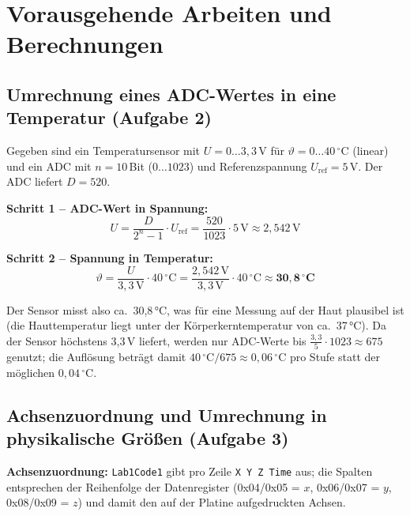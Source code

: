 \documentclass[a4paper,oneside,10pt]{article}
\begin{document}
\section{Vorausgehende Arbeiten und Berechnungen}

\subsection{Umrechnung eines ADC-Wertes in eine Temperatur (Aufgabe 2)}

Gegeben sind ein Temperatursensor mit $U = 0 \ldots 3{,}3$\,V für
$\vartheta = 0 \ldots 40\,^\circ$C (linear) und ein ADC mit $n = 10$\,Bit
($0 \ldots 1023$) und Referenzspannung $U_\mathrm{ref} = 5$\,V. Der ADC liefert
$D = 520$.

\textbf{Schritt 1 -- ADC-Wert in Spannung:}
\begin{equation}
  U = \frac{D}{2^{n}-1}\cdot U_\mathrm{ref} = \frac{520}{1023}\cdot 5\,\mathrm{V} \approx 2{,}542\,\mathrm{V}
\end{equation}

\textbf{Schritt 2 -- Spannung in Temperatur:}
\begin{equation}
  \vartheta = \frac{U}{3{,}3\,\mathrm{V}}\cdot 40\,^\circ\mathrm{C}
            = \frac{2{,}542\,\mathrm{V}}{3{,}3\,\mathrm{V}}\cdot 40\,^\circ\mathrm{C}
            \approx \mathbf{30{,}8\,^\circ C}
\end{equation}

Der Sensor misst also ca.\ 30{,}8\,°C, was für eine Messung auf der Haut plausibel
ist (die Hauttemperatur liegt unter der Körperkerntemperatur von ca.\ 37\,°C).
Da der Sensor höchstens 3{,}3\,V liefert, werden nur ADC-Werte bis
$\frac{3{,}3}{5}\cdot 1023 \approx 675$ genutzt; die Auflösung beträgt damit
$40\,^\circ\mathrm{C}/675 \approx 0{,}06\,^\circ$C pro Stufe statt der möglichen
$0{,}04\,^\circ$C.

\subsection{Achsenzuordnung und Umrechnung in physikalische Größen (Aufgabe 3)}

\textbf{Achsenzuordnung:} \texttt{Lab1Code1} gibt pro Zeile \texttt{X Y Z Time}
aus; die Spalten entsprechen der Reihenfolge der Datenregister (0x04/0x05 = $x$,
0x06/0x07 = $y$, 0x08/0x09 = $z$) und damit den auf der Platine aufgedruckten Achsen.
\end{document}
